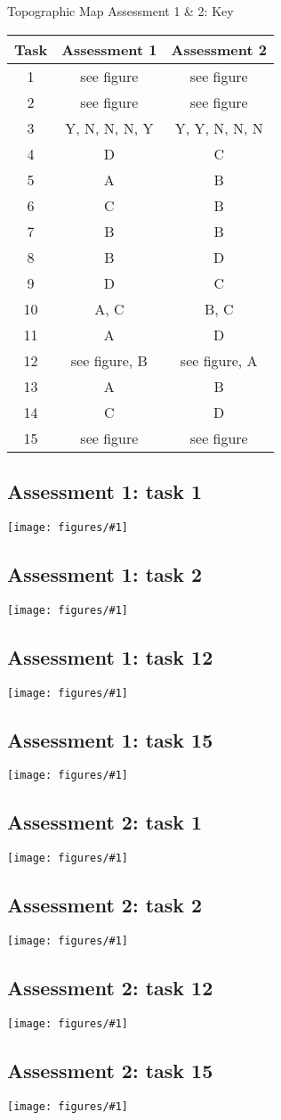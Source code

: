 \documentclass[12pt]{article}
\newcommand{\mysection}[1]{\subsection*{#1}}
\newcommand{\myimage}[1]{ \texttt{[image: figures/\#1]}}
\begin{document}

\begin{center}
\Huge
Topographic Map Assessment 1 \& 2: Key
\end{center}
\normalsize

\clearpage

% 
\large
\begin{center}
\begin{tabular}{|c|c|c|}
\rowcolor{gray!50}
\hline
 Task & Assessment 1 & Assessment 2\\ \hline \hline
 1& see figure & see figure \\
 2& see figure & see figure \\
 3& Y, N, N, N, Y& Y, Y, N, N, N\\
 4& D & C \\
 5& A & B  \\
 6& C & B \\
 7& B & B \\
 8& B & D \\
 9& D & C \\
 10& A, C&  B, C\\
 11& A & D \\
 12& see figure, B &  see figure, A\\
 13& A & B \\
 14& C & D \\
 15& see figure & see figure \\\hline
 
\end{tabular}
\end{center}
\clearpage

\mysection{Assessment 1: task 1}
\myimage{task1_1_key.png}
\mysection{Assessment 1: task 2}
\myimage{task1_2_key.png}
\mysection{Assessment 1: task 12}
\myimage{task1_11_key.png}
\mysection{Assessment 1: task 15}
\myimage{task1_17_key.png}



\mysection{Assessment 2: task 1}
\myimage{task2_1_key.png}
\mysection{Assessment 2: task 2}
\myimage{task2_2_key.png}
\mysection{Assessment 2: task 12}
\myimage{task2_11_key.png}
\mysection{Assessment 2: task 15}
\myimage{task2_17_key.png}
\end{document}
